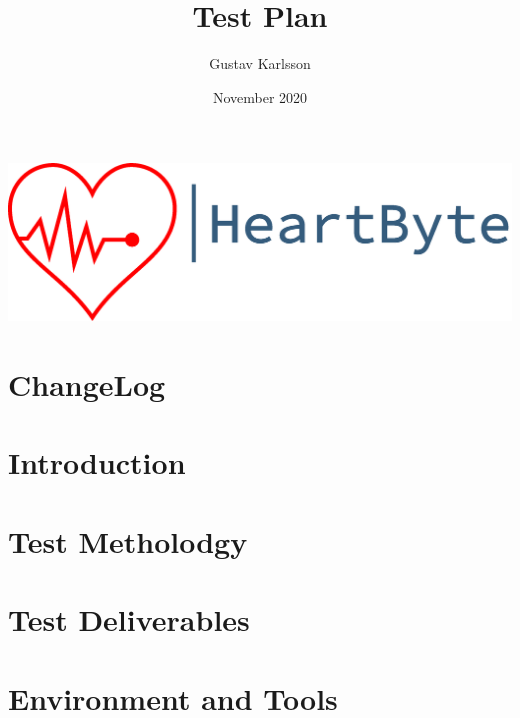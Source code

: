\documentclass[12pt]{article}
\title{\Huge Test Plan}
\author{Gustav Karlsson }
\date{November 2020}
\begin{document}
\maketitle
\vfill
\includegraphics[width=\linewidth]{Pictures/logo_heartbyte_transparent_v_1_1 (1)}

    \vfill
\clearpage


\section*{ChangeLog}



\clearpage
\tableofcontents
\clearpage
\section{Introduction}


\section{Test Metholodgy}


\section{Test Deliverables}

\section{Environment and Tools}



\end{document}
